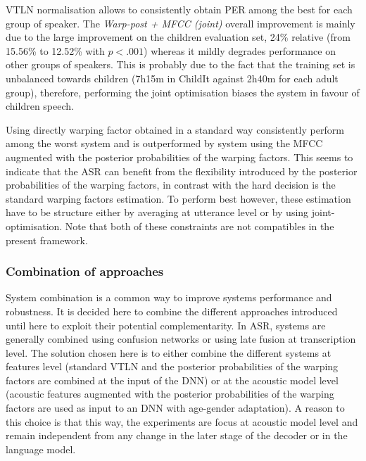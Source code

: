 \documentclass{nle}
\begin{document}
VTLN normalisation allows to consistently obtain PER among the best for each group of speaker. The {\em Warp-post + MFCC (joint)} overall improvement is mainly due to the large improvement on the children evaluation set, 24\% relative (from 15.56\% to 12.52\% with $p  <.001$) whereas it mildly degrades performance on other groups of speakers. This is probably due to the fact that the training set is unbalanced towards children (7h15m in ChildIt against 2h40m for each adult group), therefore, performing the joint optimisation biases the system in favour of children speech.

Using directly warping factor obtained in a standard way consistently perform among the worst system and is outperformed by system using the MFCC augmented with the posterior probabilities of the warping factors. This seems to indicate that the ASR can benefit from the flexibility introduced by the posterior probabilities of the warping factors, in contrast with the hard decision is the standard warping factors estimation. To perform best however, these estimation have to be structure either by averaging at utterance level or by using joint-optimisation. Note that both of these constraints are not compatibles in the present framework.


\subsubsection{Combination of approaches}
System combination is a common way to improve systems performance and robustness. It is decided here to combine the different approaches introduced until here to exploit their potential complementarity. In ASR, systems are generally combined using confusion networks or using late fusion at transcription level. The solution chosen here is to either combine the different systems at features level (standard VTLN and the posterior probabilities of the warping factors are combined at the input of the DNN) or at the acoustic model level (acoustic features augmented with the posterior probabilities of the warping factors are used as input to an DNN with age-gender adaptation). A reason to this choice is that this way, the experiments are focus at acoustic model level and remain independent from any change in the later stage of the decoder or in the language model. 
\end{document}
